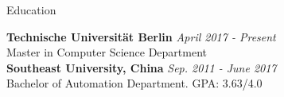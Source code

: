 \documentclass{resume} %
\begin{document}

\begin{rSection}{Education}

  {\bf Technische Universität Berlin} \hfill {\em April 2017 - Present}
  \\ Master in Computer Science Department \\

  {\bf Southeast University, China} \hfill {\em Sep. 2011 - June 2017}
  \\ Bachelor of Automation Department. \hfill { GPA: 3.63/4.0 } \\

\end{rSection}

\end{document}
